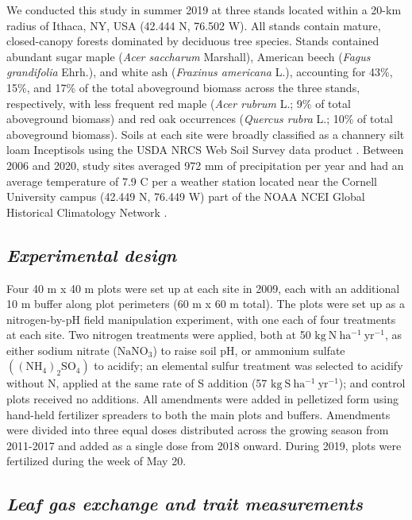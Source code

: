     We conducted this study in summer 2019 at three stands located within a 20-km radius of Ithaca, NY, USA (42.444 \textdegree{}N, 76.502 \textdegree{}W). All stands contain mature, closed-canopy forests dominated by deciduous tree species. Stands contained abundant sugar maple (\textit{Acer saccharum} Marshall), American beech (\textit{Fagus grandifolia} Ehrh.), and white ash (\textit{Fraxinus americana} L.), accounting for 43\%, 15\%, and 17\% of the total aboveground biomass across the three stands, respectively, with less frequent red maple (\textit{Acer rubrum} L.; 9\% of total aboveground biomass) and red oak occurrences (\textit{Quercus rubra} L.; 10\% of total aboveground biomass). Soils at each site were broadly classified as a channery silt loam Inceptisols using the USDA NRCS Web Soil Survey data product . Between 2006 and 2020, study sites averaged 972 mm of precipitation per year and had an average temperature of 7.9 \textdegree{}C per a weather station located near the Cornell University campus (42.449 \textdegree{}N, 76.449 \textdegree{}W) part of the NOAA NCEI Global Historical Climatology Network .


    \subsection{\textit{Experimental design}}
    Four 40 m x 40 m plots were set up at each site in 2009, each with an additional 10 m buffer along plot perimeters (60 m x 60 m total). The plots were set up as a nitrogen-by-pH field manipulation experiment, with one each of four treatments at each site. Two nitrogen treatments were applied, both at 50 $\mathrm{kg\ N\ ha^{-1}\ yr^{-1}}$, as either sodium nitrate ($\mathrm{NaNO_3}$) to raise soil pH, or ammonium sulfate $\mathrm{((NH_4)_{2}SO_4)}$ to acidify; an elemental sulfur treatment was selected to acidify without N, applied at the same rate of S addition (57 $\mathrm{kg\ S\ ha^{-1}\ yr^{-1}}$); and control plots received no additions. All amendments were added in pelletized form using hand-held fertilizer spreaders to both the main plots and buffers. Amendments were divided into three equal doses distributed across the growing season from 2011-2017 and added as a single dose from 2018 onward. During 2019, plots were fertilized during the week of May 20.

    \subsection{\textit{Leaf gas exchange and trait measurements}}

